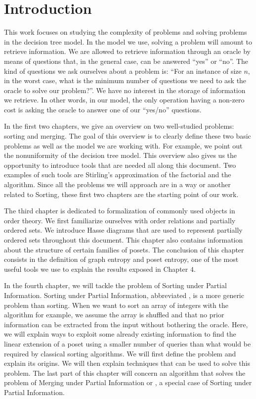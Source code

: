 \chapter*{Introduction}
%

This work focuses on studying the complexity of problems and solving problems
in the decision tree model. In the model we use, solving a problem will
amount to retrieve information. We are allowed to retrieve information
through an oracle by means of questions that, in the general case,
can be answered ``yes'' or ``no''. The kind of questions we ask ourselves
about a problem is: ``For an instance of size \(n\), in the worst case, what is
the minimum number of questions we need to ask the oracle to solve our
problem?''. We have no interest in the storage of information we retrieve.
In other words, in our model, the only operation having a non-zero cost is
asking the oracle to answer one of our ``yes/no'' questions.

In the first two chapters, we give an overview on two well-studied problems:
sorting and merging. The goal of this overview is to clearly define these
two basic problems as well as the model we are working with. For example,
we point out the nonuniformity of the decision tree model. This overview
also gives us the opportunity to introduce tools that are needed all along
this document. Two examples of such tools are Stirling's approximation of the
factorial and the
\mergesort algorithm. Since all the problems we will approach are in a way or
another related to Sorting, these first two chapters are the starting point of
our work.

The third chapter is dedicated to formalization of commonly used objects
in order theory. We first familiarize ourselves with order
relations and partially ordered sets. We introduce Hasse diagrams that
are used to represent partially ordered sets throughout this document.
This chapter also contains information about the structure of
certain families of posets. The conclusion of this
chapter consists in the definition of graph entropy and
poset entropy, one of the most useful tools we use to explain the
results exposed in Chapter \(4\).

In the fourth chapter, we will tackle the problem of Sorting under Partial
Information. Sorting under Partial Information, abbreviated , is
a more generic problem than sorting. When we want to sort an array of integers
with the \quicksort algorithm for example, we assume the array is shuffled and
that no prior information can be extracted from the input without bothering the
oracle. Here, we will explain ways to exploit some already existing information
to find the linear extension of a poset using a smaller number of queries than
what would be required by classical sorting algorithms. We will first define
the problem and explain its origins. We will then explain techniques that can
be used to solve this problem. The last part of this chapter will concern an
algorithm that solves the problem of Merging under Partial Information or
, a special case of Sorting under Partial Information.

